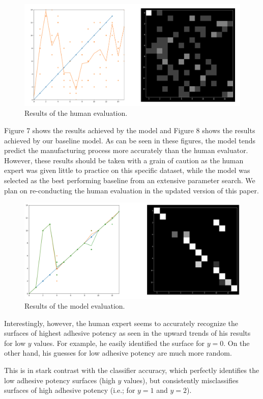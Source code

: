 \documentclass[10pt,twocolumn,letterpaper]{article}
\begin{document}
\begin{figure}[h]
	\centering
	\includegraphics[width=0.9\linewidth]{"./figures/Figure7"}
	\caption{
		Results of the human evaluation.
	}
\end{figure}

Figure 7 shows the results achieved by the model and Figure 8 shows the results achieved by our baseline model.
As can be seen in these figures, the model tends predict the manufacturing 
process more accurately than the human evaluator.
However, these results should be taken with a grain of caution 
as the human expert was given little to practice on this specific dataset,
while the model was selected as the best performing baseline from an extensive parameter search.
We plan on re-conducting the human evaluation in the updated version of this paper.

\begin{figure}[h]
	\centering
	\includegraphics[width=0.9\linewidth]{"./figures/Figure8"}
	\caption{
		Results of the model evaluation.
	}
\end{figure}

Interestingly, however, the human expert seems to accurately recognize 
the surfaces of highest adhesive potency as seen in the upward trends of his results 
for low $y$ values. For example, he easily identified the surface for $y=0$.
On the other hand, his guesses for low adhesive potency are much more random.

This is in stark contrast with the classifier accuracy, which perfectly identifies
the low adhesive potency surfaces (high $y$ values), but consistently misclassifies 
surfaces of high adhesive potency (i.e.; for $y=1$ and $y=2$).
\end{document}
